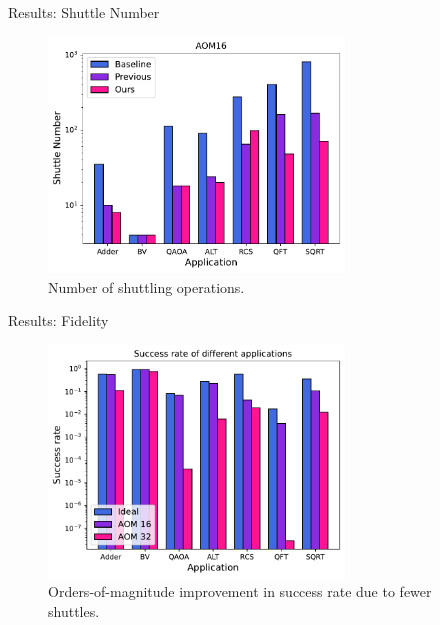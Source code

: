 \documentclass{beamer}
\begin{document}
	\begin{frame}{Results: Shuttle Number}
		\begin{figure}
			\centering
			\includegraphics[width=0.7\textwidth]{figure/Shuttle-comparation.pdf}
			\caption{Number of shuttling operations.}
		\end{figure}
	\end{frame}
	
	\begin{frame}{Results: Fidelity}
		\begin{figure}
			\centering
			\includegraphics[width=0.7\textwidth]{figure/Fidelity-true.pdf}
			\caption{Orders-of-magnitude improvement in success rate due to fewer shuttles.}
		\end{figure}
	\end{frame}
	
\end{document}
